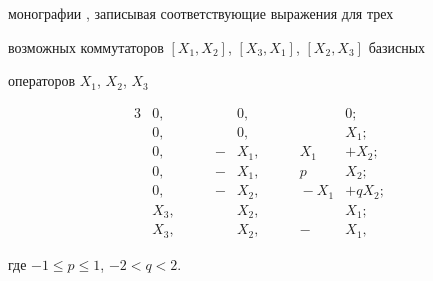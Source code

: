 монографии \cite{Pet}, записывая соответствующие выражения для трех 


возможных коммутаторов $[X_1,X_2]$, $[X_3,X_1]$, $[X_2,X_3]$ базисных 


операторов $X_1$, $X_2$, $X_3$ 


\begin{alignat}{3} 


&0, &\qquad &0, &\qquad &0;\\ 


&0, &\qquad &0, &\qquad & X_1;\\ 


&0, &\qquad -&X_1, &\qquad X_1&+X_2;\\ 


&0, &\qquad -&X_1, &\qquad p&X_2;\\ 


&0, &\qquad -&X_2, &\qquad -X_1&+qX_2;\\ 


&X_3, &\qquad &X_2, &\qquad & X_1;\\ 


&X_3, &\qquad &X_2, &\qquad -&X_1, 


\end{alignat} 


где $-1\le p\le 1$, $-2<q<2$. 


 


